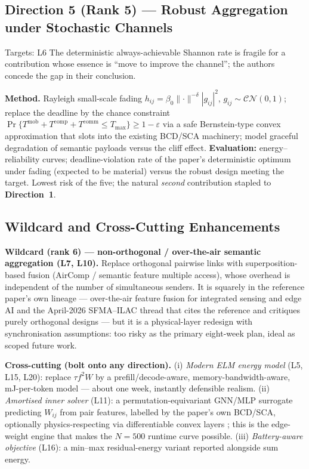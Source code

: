 \documentclass[11pt,a4paper]{article}
\newcommand{\Dir}[1]{\textcolor{accent}{\textbf{Direction~#1}}}
\begin{document}
\subsection{Direction 5 (Rank 5) --- Robust Aggregation under Stochastic Channels}
\begin{limitbox}{Targets: L6}
The deterministic always-achievable Shannon rate is fragile for a contribution whose essence is ``move to improve the channel''; the authors concede the gap in their conclusion.
\end{limitbox}
\textbf{Method.} Rayleigh small-scale fading $h_{ij}=\beta_0\lVert\cdot\rVert^{-\delta}|g_{ij}|^2$, $g_{ij}\sim\mathcal{CN}(0,1)$; replace the deadline by the chance constraint $\Pr\{T^{\mathrm{mob}}+T^{\mathrm{comp}}+T^{\mathrm{comm}}\le T_{\max}\}\ge 1-\varepsilon$ via a safe Bernstein-type convex approximation that slots into the existing BCD/SCA machinery; model graceful degradation of semantic payloads versus the cliff effect. \textbf{Evaluation:} energy--reliability curves; deadline-violation rate of the paper's deterministic optimum under fading (expected to be material) versus the robust design meeting the target. Lowest risk of the five; the natural \emph{second} contribution stapled to \Dir{1}.

\subsection{Wildcard and Cross-Cutting Enhancements}
\label{sec:cross}
\textbf{Wildcard (rank 6) --- non-orthogonal / over-the-air semantic aggregation (L7, L10).} Replace orthogonal pairwise links with superposition-based fusion (AirComp / semantic feature multiple access), whose overhead is independent of the number of simultaneous senders. It is squarely in the reference paper's own lineage --- over-the-air feature fusion for integrated sensing and edge AI \cite{isea} and the April-2026 SFMA--ILAC thread that cites the reference and critiques purely orthogonal designs \cite{sfma} --- but it is a physical-layer redesign with synchronisation assumptions: too risky as the primary eight-week plan, ideal as scoped future work.

\textbf{Cross-cutting (bolt onto any direction).} (i) \emph{Modern ELM energy model} (L5, L15, L20): replace $\tau f^2 W$ by a prefill/decode-aware, memory-bandwidth-aware, mJ-per-token model \cite{edgellm,mei4llm} --- about one week, instantly defensible realism. (ii) \emph{Amortised inner solver} (L11): a permutation-equivariant GNN/MLP surrogate predicting $W_{ij}$ from pair features, labelled by the paper's own BCD/SCA, optionally physics-respecting via differentiable convex layers \cite{cvxpylayers}; this is the edge-weight engine that makes the $N{=}500$ runtime curve possible. (iii) \emph{Battery-aware objective} (L16): a min--max residual-energy variant reported alongside sum energy.
\end{document}
